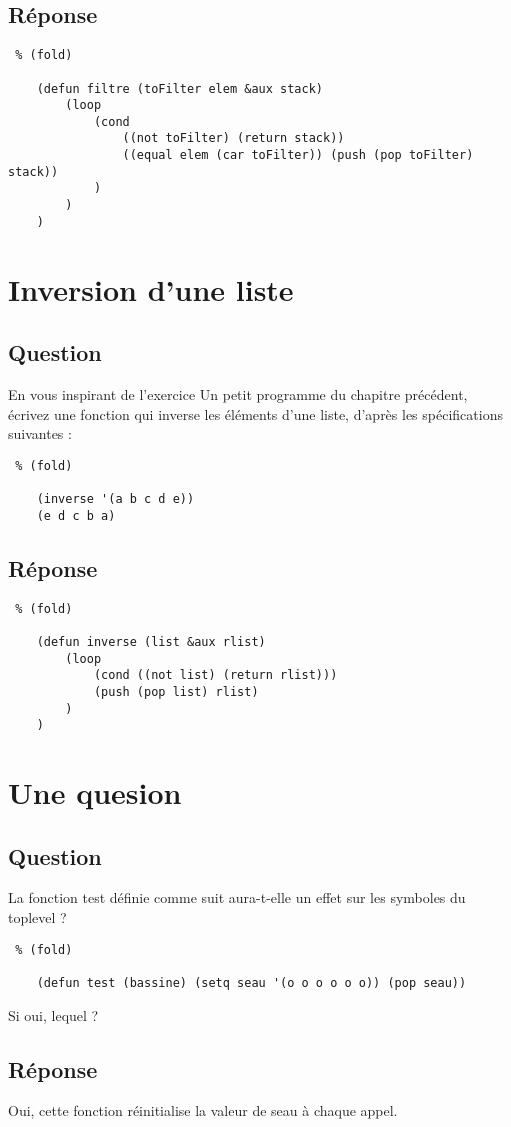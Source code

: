\documentclass[a4paper, 11pt]{article}
\begin{document}
\subsection{Réponse} %
\label{sub:Réponse}
\begin{lstlisting} % (fold)

    (defun filtre (toFilter elem &aux stack)
        (loop
            (cond
                ((not toFilter) (return stack))
                ((equal elem (car toFilter)) (push (pop toFilter) stack))
            )
        )
    )
\end{lstlisting}


\section{Inversion d'une liste} %
\label{sec:Inversion d'une liste}

\subsection{Question} %
\label{sub:Question}
En vous inspirant de l'exercice Un petit programme du chapitre précédent, écrivez une fonction qui inverse les éléments d'une liste, d'après les spécifications suivantes :
\begin{lstlisting} % (fold)

    (inverse '(a b c d e))
    (e d c b a)
\end{lstlisting}
\subsection{Réponse} %
\label{sub:Réponse}
\begin{lstlisting} % (fold)

    (defun inverse (list &aux rlist)
        (loop
            (cond ((not list) (return rlist)))
            (push (pop list) rlist)
        )
    )
\end{lstlisting}


\section{Une quesion} %
\label{sec:Une quesion}

\subsection{Question} %
\label{sub:Question}
La fonction test définie comme suit aura-t-elle un effet sur les symboles du toplevel ?
\begin{lstlisting} % (fold)

    (defun test (bassine) (setq seau '(o o o o o o)) (pop seau))
\end{lstlisting}
Si oui, lequel ?
\subsection{Réponse} %
\label{sub:Réponse}
Oui, cette fonction réinitialise la valeur de seau à chaque appel.

%
\end{document}
